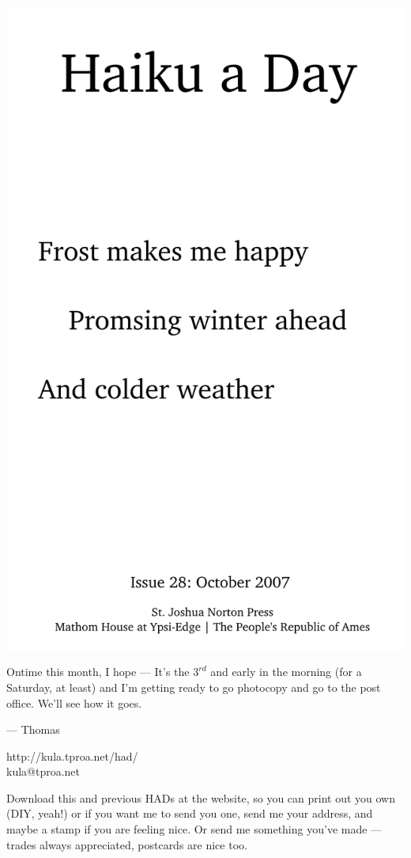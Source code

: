 \documentclass[12pt]{article}
\begin{document}
\includegraphics{frontpage.png}

\newpage

Ontime this month, I hope --- It's the $3^{rd}$ and early
in the morning (for a Saturday, at least) and I'm getting
ready to go photocopy and go to the post office. We'll see
how it goes.

--- Thomas

http://kula.tproa.net/had/ \\
kula@tproa.net

Download this and previous HADs at the website, so you can
print out you own (DIY, yeah!) or if you want me to send
you one, send me your address, and maybe a stamp if you
are feeling nice. Or send me something you've made ---
trades always appreciated, postcards are nice too.
\end{document}
